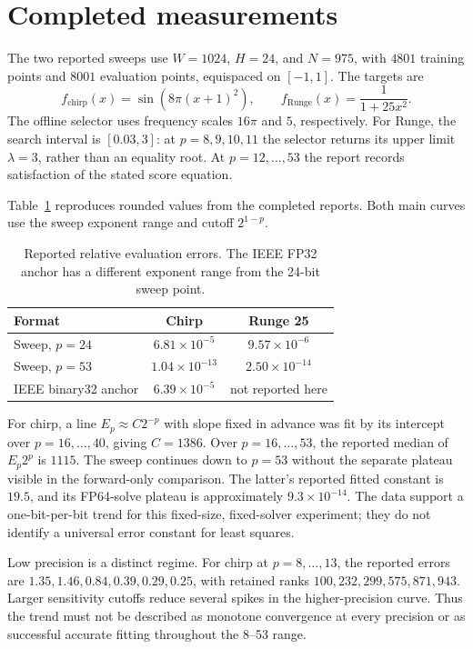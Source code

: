 \documentclass[11pt]{article}
\begin{document}
\section{Completed measurements}

The two reported sweeps use $W=1024$, $H=24$, and $N=975$, with $4801$
training points and $8001$ evaluation points, equispaced on $[-1,1]$. The
targets are
\[
 f_{\mathrm{chirp}}(x)=\sin(8\pi(x+1)^2),\qquad
 f_{\mathrm{Runge}}(x)=\frac1{1+25x^2}.
\]
The offline selector uses frequency scales $16\pi$ and $5$, respectively.
For Runge, the search interval is $[0.03,3]$: at $p=8,9,10,11$ the selector
returns its upper limit $\lambda=3$, rather than an equality root. At
$p=12,\ldots,53$ the report records satisfaction of the stated score equation.

Table~\ref{tab:results} reproduces rounded values from the completed reports.
Both main curves use the sweep exponent range and cutoff $2^{1-p}$.
\begin{table}[ht]
\centering
\caption{Reported relative evaluation errors. The IEEE FP32 anchor has a
different exponent range from the 24-bit sweep point.}
\label{tab:results}
\begin{tabular}{lcc}
\toprule
Format & Chirp & Runge 25\\
\midrule
Sweep, $p=24$ & $6.81\times10^{-5}$ & $9.57\times10^{-6}$\\
Sweep, $p=53$ & $1.04\times10^{-13}$ & $2.50\times10^{-14}$\\
IEEE binary32 anchor & $6.39\times10^{-5}$ & not reported here\\
\bottomrule
\end{tabular}
\end{table}

For chirp, a line $E_p\approx C2^{-p}$ with slope fixed in advance was fit
by its intercept over $p=16,\ldots,40$, giving $C=1386$. Over
$p=16,\ldots,53$, the reported median of $E_p2^p$ is $1115$. The sweep
continues down to $p=53$ without the separate plateau visible in the
forward-only comparison. The latter's reported fitted constant is $19.5$,
and its FP64-solve plateau is approximately $9.3\times10^{-14}$. The data
support a one-bit-per-bit trend for this fixed-size, fixed-solver experiment;
they do not identify a universal error constant for least squares.

Low precision is a distinct regime. For chirp at $p=8,\ldots,13$, the
reported errors are $1.35,1.46,0.84,0.39,0.29,0.25$, with retained ranks
$100,232,299,575,871,943$. Larger sensitivity cutoffs reduce several spikes
in the higher-precision curve. Thus the trend must not be described as
monotone convergence at every precision or as successful accurate fitting
throughout the 8--53 range.
\end{document}
